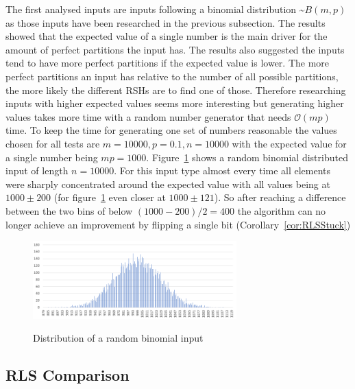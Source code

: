 The first analysed inputs are inputs following a binomial distribution \textasciitilde$B(m,p)$ as those inputs have been researched in the previous subsection.
The results showed that the expected value of a single number is the main driver for the amount of perfect partitions the input has.
The results also suggested the inputs tend to have more perfect partitions if the expected value is lower.
The more perfect partitions an input has relative to the number of all possible partitions, the more likely the different RSHs are to find one of those.
Therefore researching inputs with higher expected values seems more interesting but generating higher values takes more time with a random number generator that needs $\mathcal{O}(mp)$ time.
To keep the time for generating one set of numbers reasonable the values chosen for all tests are $m=10000, p=0.1, n=10000$ with the expected value for a single number being $mp=1000$.
Figure~\ref{fig:binDistExample} shows a random binomial distributed input of length $n=10000$.
For this input type almost every time all elements were sharply concentrated around the expected value with all values being at $1000\pm200$ (for figure~\ref{fig:binDistExample} even closer at $1000\pm121$).
So after reaching a difference between the two bins of below $(1000-200)/2=400$ the algorithm can no longer achieve an improvement by flipping a single bit (Corollary~\ref{cor:RLSStuck})

\begin{figure}[h]
      \caption{Distribution of a random binomial input}
      \centering
      \includegraphics[width=0.7\textwidth]{figures/images/numberGenerator/binomialDistributionForN10000p0_1.png}\label{fig:binDistExample}
\end{figure}
\subsection{RLS Comparison}


